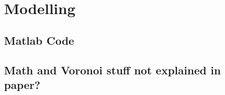 \chapter{Modelling}
\label{ch:Appendix-Modelling} 
\section{Matlab Code}

\section{Math and Voronoi stuff not explained in paper?} 

